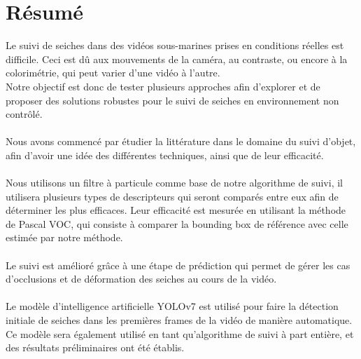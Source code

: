 \pagestyle{plain}
\chapter*{Résumé}
Le suivi de seiches dans des vidéos sous-marines prises en conditions réelles est difficile. Ceci est dû aux mouvements de la caméra, au contraste, ou encore à la colorimétrie, qui peut varier d'une vidéo à l'autre.\\
Notre objectif est donc de tester plusieurs approches afin d'explorer et de proposer des solutions robustes pour le suivi de seiches en environnement non contrôlé.\\
\\
Nous avons commencé par étudier la littérature dans le domaine du suivi d'objet, afin d'avoir une idée des différentes techniques, ainsi que de leur efficacité.\\
\\
Nous utilisons un filtre à particule comme base de notre algorithme de suivi, il utilisera plusieurs types de descripteurs qui seront comparés entre eux afin de déterminer les plus efficaces. Leur efficacité est mesurée en utilisant la méthode de Pascal VOC, qui consiste à comparer la bounding box de référence avec celle estimée par notre méthode.\\
\\
Le suivi est amélioré grâce à une étape de prédiction qui permet de gérer les cas d'occlusions et de déformation des seiches au cours de la vidéo.\\
\\
Le modèle d'intelligence artificielle YOLOv7 est utilisé pour faire la détection initiale de seiches dans les premières frames de la vidéo de manière automatique.\\
Ce modèle sera également utilisé en tant qu'algorithme de suivi à part entière, et des résultats préliminaires ont été établis.\\


\clearpage
